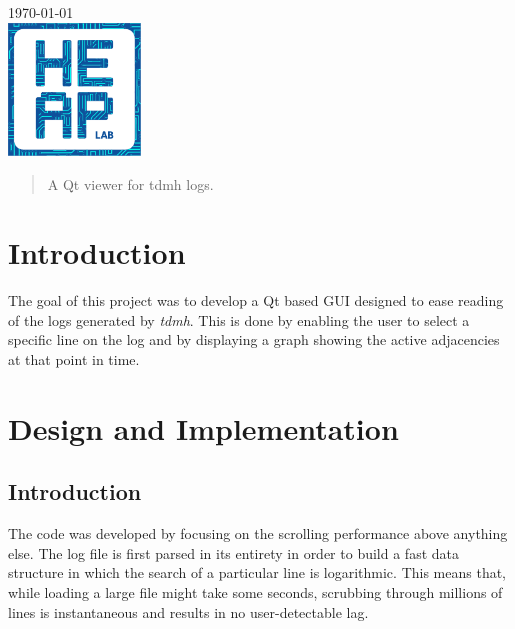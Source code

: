 \begin{titlepage}

{\large \today}\\[2cm] %


\includegraphics[width=100pt]{heaplogo.pdf}\\[1cm] %
 

\vfill %

\end{titlepage}




\begin{abstract}
A Qt viewer for tdmh logs.
\end{abstract}

\section{Introduction}

The goal of this project was to develop a Qt based GUI designed to ease reading of the logs generated by \textit{tdmh}. This is done by enabling the user to select a specific line on the log and by displaying a graph showing the active adjacencies at that point in time.

\section{Design and Implementation}

\subsection{Introduction}
The code was developed by focusing on the scrolling performance above anything else. The log file is first parsed in its entirety in order to build a fast data structure in which the search of a particular line is logarithmic. This means that, while loading a large file might take some seconds, scrubbing through millions of lines is instantaneous and results in no user-detectable lag.

